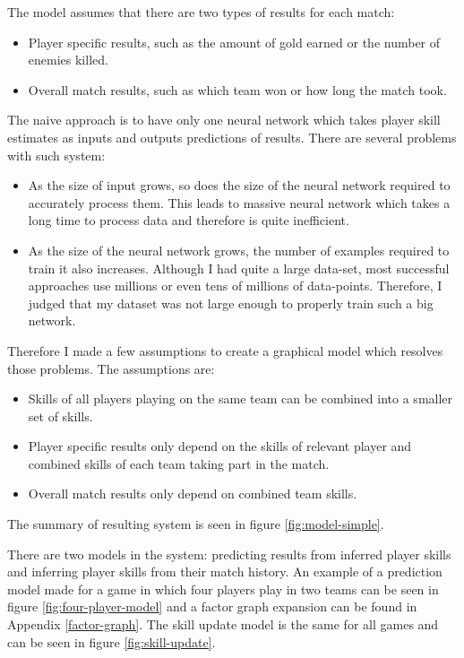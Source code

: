 \documentclass[12pt,a4paper]{book}
\begin{document}
The model assumes that there are two types of results for each match:
\begin{itemize}
\item Player specific results, such as the amount of gold earned or the number of enemies killed.
\item Overall match results, such as which team won or how long the match took.
\end{itemize}
The naive approach is to have only one neural network which takes player skill estimates as inputs and outputs predictions of results.
There are several problems with such system:
\begin{itemize}
\item As the size of input grows, so does the size of the neural network required to accurately process them.
This leads to massive neural network which takes a long time to process data and therefore is quite inefficient.
\item As the size of the neural network grows, the number of examples required to train it also increases.
Although I had quite a large data-set, most successful approaches use millions or even tens of millions of data-points.
Therefore, I judged that my dataset was not large enough to properly train such a big network.
\end{itemize}
Therefore I made a few assumptions to create a graphical model which resolves those problems.
The assumptions are:
\begin{itemize}
\item Skills of all players playing on the same team can be combined into a smaller set of skills.
\item Player specific results only depend on the skills of relevant player and combined skills of each team taking part in the match.
\item Overall match results only depend on combined team skills.
\end{itemize}
The summary of resulting system is seen in figure \ref{fig:model-simple}.

There are two models in the system: predicting results from inferred player skills and inferring player skills from their match history.
An example of a prediction model made for a game in which four players play in two teams can be seen in figure \ref{fig:four-player-model} and a factor graph expansion can be found in Appendix \ref{factor-graph}.
The skill update model is the same for all games and can be seen in figure \ref{fig:skill-update}.
\end{document}
